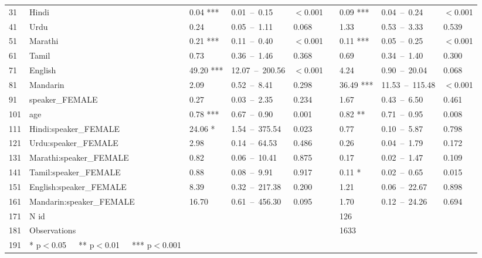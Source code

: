 \begin{table}[ht]
\begin{tabular}{}
  31 & Hindi & 0.04 *** & 0.01 – 0.15 & $<$0.001 &  & 0.09 *** & 0.04 – 0.24 & $<$0.001 \\ 
  41 & Urdu & 0.24 & 0.05 – 1.11 & 0.068 &  & 1.33 & 0.53 – 3.33 & 0.539 \\ 
  51 & Marathi & 0.21 *** & 0.11 – 0.40 & $<$0.001 &  & 0.11 *** & 0.05 – 0.25 & $<$0.001 \\ 
  61 & Tamil & 0.73 & 0.36 – 1.46 & 0.368 &  & 0.69 & 0.34 – 1.40 & 0.300 \\ 
  71 & English & 49.20 *** & 12.07 – 200.56 & $<$0.001 &  & 4.24 & 0.90 – 20.04 & 0.068 \\ 
  81 & Mandarin & 2.09 & 0.52 – 8.41 & 0.298 &  & 36.49 *** & 11.53 – 115.48 & $<$0.001 \\ 
  91 & speaker\_FEMALE & 0.27 & 0.03 – 2.35 & 0.234 &  & 1.67 & 0.43 – 6.50 & 0.461 \\ 
  101 & age & 0.78 *** & 0.67 – 0.90 & 0.001 &  & 0.82 ** & 0.71 – 0.95 & 0.008 \\ 
  111 & Hindi:speaker\_FEMALE & 24.06 * & 1.54 – 375.54 & 0.023 &  & 0.77 & 0.10 – 5.87 & 0.798 \\ 
  121 & Urdu:speaker\_FEMALE & 2.98 & 0.14 – 64.53 & 0.486 &  & 0.26 & 0.04 – 1.79 & 0.172 \\ 
  131 & Marathi:speaker\_FEMALE & 0.82 & 0.06 – 10.41 & 0.875 &  & 0.17 & 0.02 – 1.47 & 0.109 \\ 
  141 & Tamil:speaker\_FEMALE & 0.88 & 0.08 – 9.91 & 0.917 &  & 0.11 * & 0.02 – 0.65 & 0.015 \\ 
  151 & English:speaker\_FEMALE & 8.39 & 0.32 – 217.38 & 0.200 &  & 1.21 & 0.06 – 22.67 & 0.898 \\ 
  161 & Mandarin:speaker\_FEMALE & 16.70 & 0.61 – 456.30 & 0.095 &  & 1.70 & 0.12 – 24.26 & 0.694 \\ 
  171 & N id &  &  &  &  & 126 &  &  \\ 
  181 & Observations &  &  &  &  & 1633 &  &  \\ 
  191 & * p$<$0.05   ** p$<$0.01   *** p$<$0.001 &  &  &  &  &  &  &  \\ 
   \hline
\end{tabular}
\end{table}
